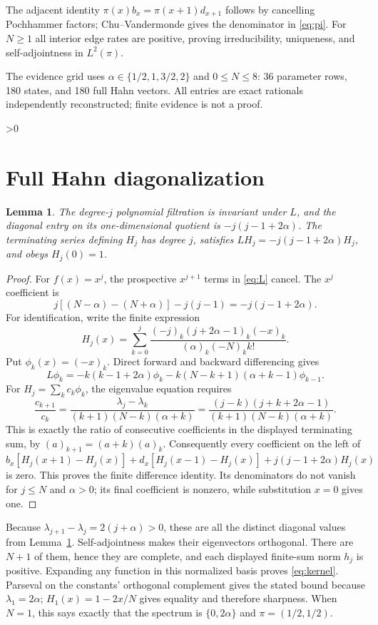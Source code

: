 \documentclass[10pt]{article}
\newtheorem{lemma}{Lemma}
\begin{document}
The adjacent identity $\pi(x)b_x=\pi(x+1)d_{x+1}$ follows by cancelling
Pochhammer factors; Chu--Vandermonde gives the denominator in \eqref{eq:pi}.
For $N\geq1$ all interior edge rates are positive, proving irreducibility,
uniqueness, and self-adjointness in $L^2(\pi)$.

The evidence grid uses $\alpha\in\{1/2,1,3/2,2\}$ and $0\leq N\leq8$:
36 parameter rows, 180 states, and 180 full Hahn vectors. All entries are
exact rationals independently reconstructed; finite evidence is not a proof.

\ifnum\CRevisionRound>0
\section{Full Hahn diagonalization}
\begin{lemma}\label{lem:tri}
The degree-$j$ polynomial filtration is invariant under $L$, and the diagonal
entry on its one-dimensional quotient is $-j(j-1+2\alpha)$.
The terminating series defining $H_j$ has degree $j$, satisfies
$LH_j=-j(j-1+2\alpha)H_j$, and obeys $H_j(0)=1$.
\end{lemma}
\begin{proof}
For $f(x)=x^j$, the prospective $x^{j+1}$ terms in \eqref{eq:L} cancel. The
$x^j$ coefficient is
\[
 j[(N-\alpha)-(N+\alpha)]-j(j-1)=-j(j-1+2\alpha).
\]
For identification, write the finite expression
\[
 H_j(x)=\sum_{k=0}^j
 \frac{(-j)_k(j+2\alpha-1)_k(-x)_k}
      {(\alpha)_k(-N)_k k!}.
\]
Put $\phi_k(x)=(-x)_k$. Direct forward and backward differencing gives
\[
 L\phi_k=-k(k-1+2\alpha)\phi_k
 -k(N-k+1)(\alpha+k-1)\phi_{k-1}.
\]
For $H_j=\sum_kc_k\phi_k$, the eigenvalue equation requires
\[
 \frac{c_{k+1}}{c_k}=
 \frac{\lambda_j-\lambda_k}{(k+1)(N-k)(\alpha+k)}
 =\frac{(j-k)(j+k+2\alpha-1)}{(k+1)(N-k)(\alpha+k)}.
\]
This is exactly the ratio of consecutive coefficients in the displayed
terminating sum, by $(a)_{k+1}=(a+k)(a)_k$. Consequently every coefficient
on the left of
\[
 b_x[H_j(x+1)-H_j(x)]+d_x[H_j(x-1)-H_j(x)]
 +j(j-1+2\alpha)H_j(x)
\]
is zero. This proves the finite difference identity. Its denominators do not
vanish for $j\leq N$ and $\alpha>0$; its final coefficient is nonzero, while
substitution $x=0$ gives one.
\end{proof}

Because $\lambda_{j+1}-\lambda_j=2(j+\alpha)>0$, these are all the distinct
diagonal values from Lemma~\ref{lem:tri}. Self-adjointness makes their
eigenvectors orthogonal. There are $N+1$ of them, hence they are complete, and
each displayed finite-sum norm $h_j$ is positive. Expanding any function in
this normalized basis proves \eqref{eq:kernel}. Parseval on the constants'
orthogonal complement gives the stated bound because $\lambda_1=2\alpha$;
$H_1(x)=1-2x/N$ gives equality and therefore sharpness. When $N=1$, this says
exactly that the spectrum is $\{0,2\alpha\}$ and $\pi=(1/2,1/2)$.
\end{document}

